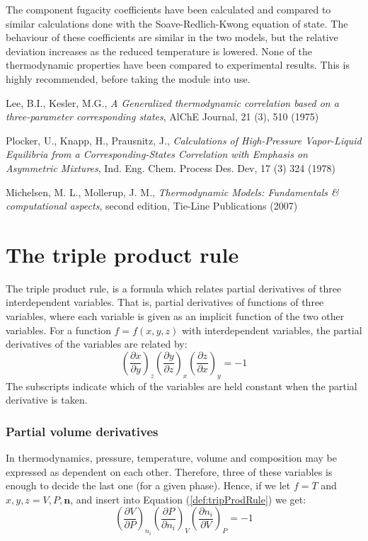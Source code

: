 \documentclass[internal,english]{sintefmemo2012}
\numberwithin{equation}{section}
\newcommand*{\pder}[2]{\left(\frac{\partial #1}{\partial #2}\right)}
\newcommand*{\reff}[1]{(\ref{#1})}
\begin{document}
The component fugacity coefficients have been calculated and compared to similar calculations done with the Soave-Redlich-Kwong equation of state. The behaviour of these coefficients are similar in the two models, but the relative deviation increases as the reduced temperature is lowered. 
None of the thermodynamic properties have been compared to experimental results. This is highly recommended, before taking the module into use.

\clearpage
\begin{thebibliography}{9}
  
	Lee, B.I., Kesler, M.G., \textit{A Generalized thermodynamic correlation based on a three-parameter corresponding states}, AlChE Journal, 21 (3), 510 (1975)

	Plocker, U., Knapp, H., Prausnitz, J., \textit{Calculations of High-Pressure Vapor-Liquid Equilibria from a Corresponding-States Correlation with Emphasis on Asymmetric Mixtures}, Ind. Eng. Chem. Process Des. Dev, 17 (3) 324 (1978)
	
	Michelsen, M. L., Mollerup, J. M., \textit{Thermodynamic Models: Fundamentals \& computational aspects}, second edition, Tie-Line Publications (2007)


\end{thebibliography}

\clearpage
\appendix

\section{The triple product rule}
\label{app:tripProdRule}
The triple product rule, is a formula which relates partial derivatives of three interdependent variables. That is, partial derivatives of functions of three variables, where each variable is given as an implicit function of the two other variables. For a function $f = f(x,y,z)$ with interdependent variables, the partial derivatives of the variables are related by:
\begin{equation}
\label{def:tripProdRule}
\pder{x}{y}_z \pder{y}{z}_x \pder{z}{x}_y = -1
\end{equation}
The subscripts indicate which of the variables are held constant when the partial derivative is taken.

\subsubsection*{Partial volume derivatives}
In thermodynamics, pressure, temperature, volume and composition may be expressed as dependent on each other. Therefore, three of these variables is enough to decide the last one (for a given phase). Hence, if we let $f = T$ and $x,y,z = V,P,\textbf{n}$, and insert into Equation \reff{def:tripProdRule} we get:
\begin{equation}
\pder{V}{P}_{n_i} \pder{P}{n_i}_V \pder{n_i}{V}_P = -1
\end{equation}
\end{document}
